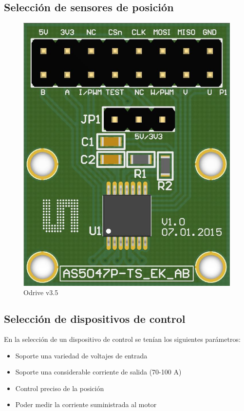 \subsection{Selección de sensores de posición}
\begin{figure}
    \centering
    \includegraphics[scale=0.3]{./img/chapter3/encoder.png}
    \caption{Odrive v3.5}
    \label{fig:odrive}
\end{figure}


\subsection{Selección de dispositivos de control}

En la selección de un dispositivo de control se tenían los siguientes parámetros:

\begin{itemize}
\itemsep0em
\item Soporte una variedad de voltajes de entrada
\item Soporte una considerable corriente de salida (70-100 A)
\item Control preciso de la posición
\item Poder medir la corriente suministrada al motor
\end{itemize}

